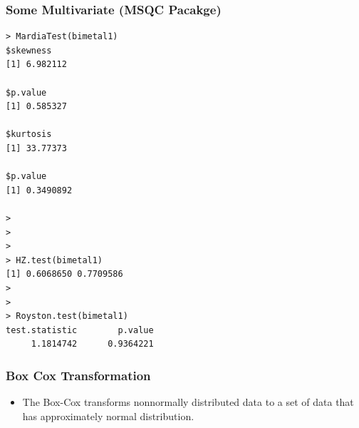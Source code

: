 \documentclass[]{article}
\begin{document}
\subsubsection{Some Multivariate (MSQC Pacakge)}
\begin{framed}
\begin{verbatim}
> MardiaTest(bimetal1)
$skewness
[1] 6.982112

$p.value
[1] 0.585327

$kurtosis
[1] 33.77373

$p.value
[1] 0.3490892

> 
>
>
> HZ.test(bimetal1)
[1] 0.6068650 0.7709586
> 
> 
> Royston.test(bimetal1)
test.statistic        p.value 
     1.1814742      0.9364221 
\end{verbatim}
\end{framed}




\subsubsection{Box Cox Transformation}
\begin{itemize}
\item The Box-Cox transforms nonnormally distributed data to a set of  data that has approximately normal distribution. 
\end{itemize}
\newpage


\newpage
\end{document}

